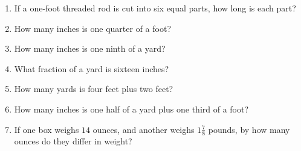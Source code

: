 \documentclass[12pt]{article}
\begin{document}
\begin{enumerate}
\item If a one-foot threaded rod is cut into six equal parts, how long is each part?
\spacing

\item How many inches is one quarter of a foot? 
\spacing

\item How many inches is one ninth of a yard? 
\spacing

\item What fraction of a yard is sixteen inches?  
\spacing

\item How many yards is four feet plus two feet?  
\spacing

\item How many inches is one half of a yard plus one third of a foot?  
\spacing

\item If one box weighs $14$ ounces, and another weighs $1\frac{7}{8}$ pounds, by how many ounces do they differ in weight? 
\spacing

\end{enumerate}
\end{document}
